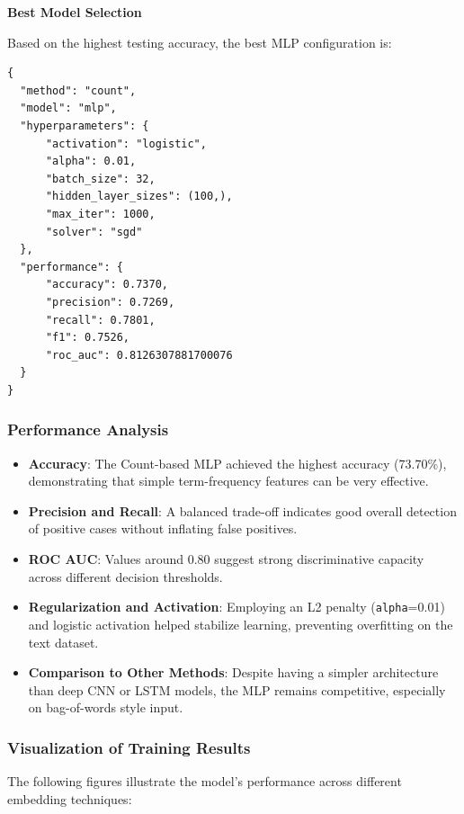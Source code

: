 \textbf{Best Model Selection}

Based on the highest testing accuracy, the best MLP configuration is:
\begin{verbatim}
{
  "method": "count",
  "model": "mlp",
  "hyperparameters": {
      "activation": "logistic",
      "alpha": 0.01,
      "batch_size": 32,
      "hidden_layer_sizes": (100,),
      "max_iter": 1000,
      "solver": "sgd"
  },
  "performance": {
      "accuracy": 0.7370,
      "precision": 0.7269,
      "recall": 0.7801,
      "f1": 0.7526,
      "roc_auc": 0.8126307881700076
  }
}
\end{verbatim}

\subsubsection{Performance Analysis}

\begin{itemize}
    \item \textbf{Accuracy}: The Count-based MLP achieved the highest accuracy (73.70\%), demonstrating that simple term-frequency features can be very effective.
    \item \textbf{Precision and Recall}: A balanced trade-off indicates good overall detection of positive cases without inflating false positives.
    \item \textbf{ROC AUC}: Values around 0.80 suggest strong discriminative capacity across different decision thresholds.
    \item \textbf{Regularization and Activation}: Employing an L2 penalty (\texttt{alpha}=0.01) and logistic activation helped stabilize learning, preventing overfitting on the text dataset.
    \item \textbf{Comparison to Other Methods}: Despite having a simpler architecture than deep CNN or LSTM models, the MLP remains competitive, especially on bag-of-words style input.
\end{itemize}

\subsubsection{Visualization of Training Results}
The following figures illustrate the model’s performance across different embedding techniques:

